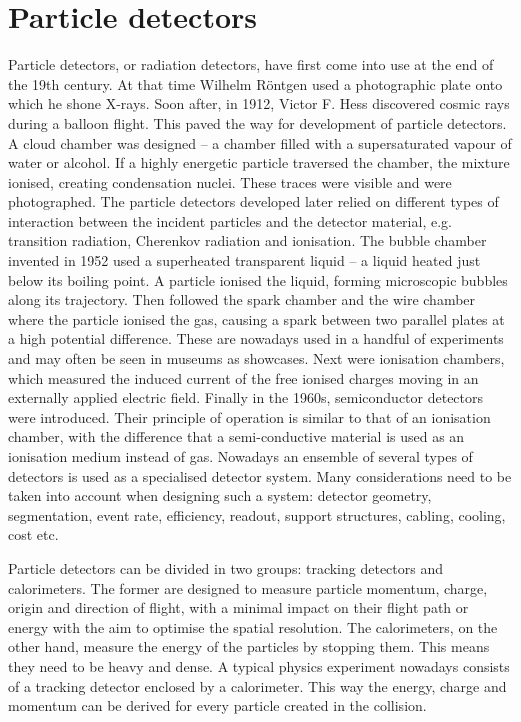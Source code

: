 \section{Particle detectors}
Particle detectors, or radiation detectors, have first come into use at the end of the 19th century. At that time Wilhelm R\"ontgen used a photographic plate onto which he shone X-rays. Soon after, in 1912, Victor F. Hess discovered cosmic rays during a balloon flight. This paved the way for development of particle detectors. A cloud chamber was designed -- a chamber filled with a supersaturated vapour of water or alcohol. If a highly energetic particle traversed the chamber, the mixture ionised, creating condensation nuclei. These traces were visible and were photographed. The particle detectors developed later relied on different types of interaction between the incident particles and the detector material, e.g. transition radiation, Cherenkov radiation and ionisation. The bubble chamber invented in 1952 used a superheated transparent liquid -- a liquid heated just below its boiling point. A particle ionised the liquid, forming microscopic bubbles along its trajectory. Then followed the spark chamber and the wire chamber where the particle ionised the gas, causing a spark between two parallel plates at a high potential difference. These are nowadays used in a handful of experiments and may often be seen in museums as showcases. Next were ionisation chambers, which measured the induced current of the free ionised charges moving in an externally applied electric field. Finally in the 1960s, semiconductor detectors were introduced. Their principle of operation is similar to that of an ionisation chamber, with the difference that a semi-conductive material is used as an ionisation medium instead of gas. Nowadays an ensemble of several types of detectors is used as a specialised detector system. Many considerations need to be taken into account when designing such a system: detector geometry, segmentation, event rate, efficiency, readout, support structures, cabling, cooling, cost etc.

Particle detectors can be divided in two groups: tracking detectors and calorimeters. The former are designed to measure  particle momentum, charge, origin and direction of flight, with a minimal impact on their flight path or energy with the aim to optimise the spatial resolution. The calorimeters, on the other hand, measure the energy of the particles by stopping them. This means they need to be heavy and dense. A typical physics experiment nowadays consists of a tracking detector enclosed by a calorimeter. This way the energy, charge and momentum can be derived for every particle created in the collision.





